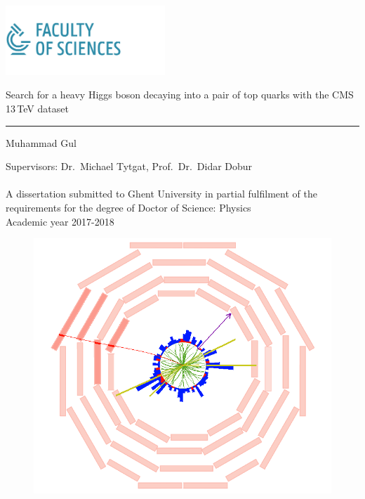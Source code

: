 \documentclass[10pt,a4paper,twoside,openright,dutch,english]{book}
\begin{document}
\latintext
\graphicspath{{fig/}}

% 
 \thispagestyle{empty}   %
% 
 \noindent
 \begin{minipage}{6cm}%
   \includegraphics*[width=6cm]{fig/UGent_WE_logo.png}%
 \end{minipage}\hfill
% 
\bigskip
   \begin{flushleft}
     \Large \textsf{Search for a heavy Higgs boson decaying into a pair of top quarks with
the CMS 13\,TeV dataset}\\
    \end{flushleft}
 \hrule 
% 
 \bigskip \bigskip
   \LARGE\noindent \textsf{Muhammad Gul} \hfill \\
    \bigskip

\noindent\large\textsf{Supervisors: Dr.\ Michael Tytgat, Prof.\ Dr.\ Didar Dobur}\\ \\
A dissertation submitted to Ghent University in partial fulfilment of the requirements for the degree of Doctor of Science: Physics \\ 
\bigskip
Academic year 2017-2018
\\ 
\begin{figure}[htb]%
  \centering%
  \includegraphics*[width=13cm]{fig/front/higgs_semilep-1_1_1_RhoPhi.pdf}%
\end{figure}%
\end{document}
